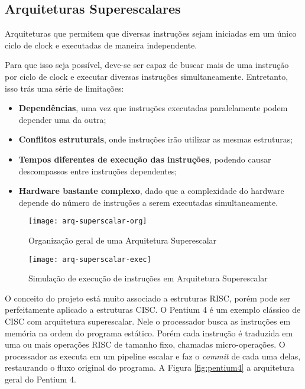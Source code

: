 \subsection{Arquiteturas Superescalares}

\begin{definicao}{}
  Arquiteturas que permitem que diversas instruções sejam iniciadas em um único ciclo de clock e executadas de maneira independente.
\end{definicao}

Para que isso seja possível, deve-se ser capaz de buscar mais de uma instrução
por ciclo de clock e executar diversas instruções simultaneamente. Entretanto, isso trás uma série de limitações:
\begin{itemize}
  \item \textbf{Dependências}, uma vez que instruções executadas paralelamente podem depender uma da outra;

  \item \textbf{Conflitos estruturais}, onde instruções irão utilizar as mesmas estruturas;

  \item \textbf{Tempos diferentes de execução das instruções}, podendo causar descompassos entre instruções dependentes;

  \item \textbf{Hardware bastante complexo}, dado que a complexidade do hardware depende do número de instruções a serem executadas simultaneamente.
\end{itemize}

\begin{figure}[ht]
  \centering
  \texttt{[image: arq-superscalar-org]}
  \caption{Organização geral de uma Arquitetura Superescalar}
  \label{fig:arq-superscalar-org}
\end{figure}

\begin{figure}[ht]
  \centering
  \texttt{[image: arq-superscalar-exec]}
  \caption{Simulação de execução de instruções em Arquitetura Superescalar}
  \label{fig:arq-superscalar-exec}
\end{figure}

O conceito do projeto está muito associado a estruturas RISC, porém pode ser perfeitamente aplicado a estruturas CISC. O Pentium 4 é um exemplo clássico de CISC com arquitetura superescalar. Nele o processador busca as instruções em memória na ordem do programa estático. Porém cada instrução é traduzida em uma ou mais operações RISC de tamanho fixo, chamadas micro-operações. O processador as executa em um pipeline escalar e faz o \textit{commit} de cada uma delas, restaurando o fluxo original do programa. A Figura \ref{fig:pentium4} a arquitetura geral do Pentium 4.


